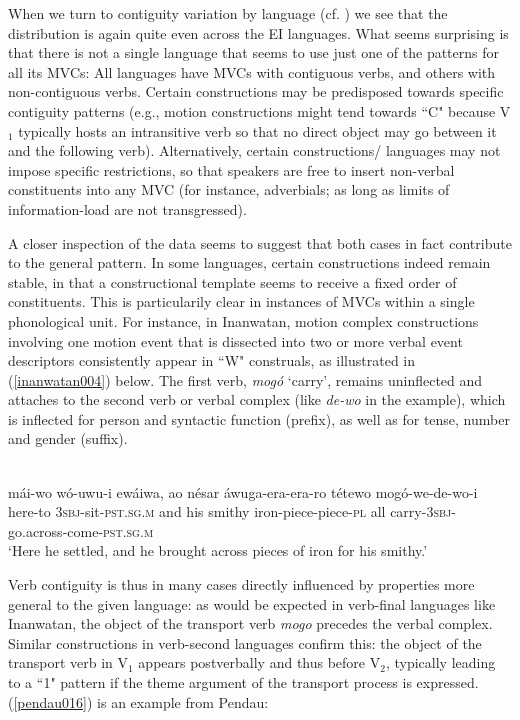 When we turn to contiguity variation by language (cf. ) we see that the distribution is again quite even across the EI languages. What seems surprising is that there is not a single language that seems to use just one of the patterns for all its MVCs: All languages have MVCs with contiguous verbs, and others with non-contiguous verbs. Certain constructions may be predisposed towards specific contiguity patterns (e.g., motion constructions might tend towards ``C" because V$_1$ typically hosts an intransitive verb so that no direct object may go between it and the following verb). Alternatively, certain constructions/ languages may not impose specific restrictions, so that speakers are free to insert non-verbal constituents into any MVC (for instance, adverbials; as long as limits of information-load are not transgressed). 

A closer inspection of the data seems to suggest that both cases in fact contribute to the general pattern. In some languages, certain constructions indeed remain stable, in that a constructional template seems to receive a fixed order of constituents. This is particularily clear in instances of MVCs within a single phonological unit. For instance, in Inanwatan, motion complex constructions involving one motion event that is dissected into two or more verbal event descriptors consistently appear in ``W" construals, as illustrated in (\ref{inanwatan004}) below. The first verb, \textit{mogó} `carry', remains uninflected and attaches to the second verb or verbal complex (like \textit{de-wo} in the example), which is inflected for person and syntactic function (prefix), as well as for tense, number and gender (suffix).

\ea \label{inanwatan004}
\\
\gll mái-wo wó-uwu-i ewáiwa, ao nésar áwuga-era-era-ro tétewo mogó-we-de-wo-i \\
here-to 3\textsc{sbj}-sit-\textsc{pst}.\textsc{sg}.\textsc{m} and his smithy iron-piece-piece-\textsc{pl} all carry-3\textsc{sbj}-go.across-come-\textsc{pst}.\textsc{sg}.\textsc{m} \\
\glft `Here he settled, and he brought across pieces of iron for his smithy.'\\ 
\z

Verb contiguity is thus in many cases directly influenced by properties more general to the given language: as would be expected in verb-final languages like Inanwatan, the object of the transport verb \textit{mogo} precedes the verbal complex. Similar constructions in verb-second languages confirm this: the object of the transport verb in V$_1$ appears postverbally and thus before V$_2$, typically leading to a ``1" pattern if the theme argument of the transport process is expressed. (\ref{pendau016}) is an example from Pendau:

